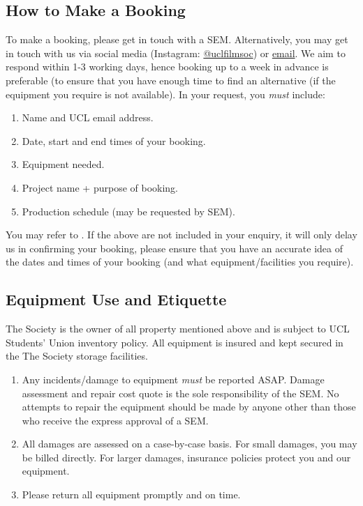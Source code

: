 \documentclass[]{article}
\begin{document}
\subsection{How to Make a Booking}
To make a booking, please get in touch with a SEM. Alternatively, you may get in touch with us via social media (Instagram: \href{https://www.instagram.com/uclfilmsociety/?hl=en}{@uclfilmsoc}) or \href{mailto:uclfilmsociety@gmail.com}{email}. We aim to respond within 1-3 working days, hence booking up to a week in advance is preferable (to ensure that you have enough time to find an alternative (if the equipment you require is not available). In your request, you \textit{must} include:
\begin{enumerate}
    \item Name and UCL email address.
    \item Date, start and end times of your booking.
    \item Equipment needed.
    \item Project name + purpose of booking.
    \item Production schedule (may be requested by SEM).
\end{enumerate}
You may refer to . If the above are not included in your enquiry, it will only delay us in confirming your booking, please ensure that you have an accurate idea of the dates and times of your booking (and what equipment/facilities you require).
\subsection{Equipment Use and Etiquette}
The Society is the owner of all property mentioned above and is subject to UCL Students' Union inventory policy. All equipment is insured and kept secured in the The Society storage facilities.
\begin{enumerate}
    \item Any incidents/damage to equipment \textit{must} be reported ASAP. Damage assessment and repair cost quote is the sole responsibility of the SEM. No attempts to repair the equipment should be made by anyone other than those who receive the express approval of a SEM.
    \item All damages are assessed on a case-by-case basis. For small damages, you may be billed directly. For larger damages, insurance policies protect you and our equipment.
    \item Please return all equipment promptly and on time.
\end{enumerate}
\end{document}
